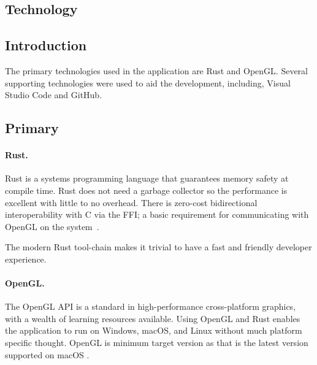 \setlength{\columnsep}{0.5cm}
\begin{multicols}{2}

  \section{Technology}\label{technology}

  \subsection{Introduction}
  The primary technologies used in the application are Rust and OpenGL\@.
  Several supporting technologies were used to aid the development, including, Visual Studio Code and GitHub.

  \subsection{Primary}

  \paragraph{ Rust.}
  Rust is a systems programming language that guarantees memory safety at compile time.
  Rust does not need a garbage collector so the performance is excellent with little to no overhead.
  There is zero-cost bidirectional interoperability with C via the FFI\@;
  a basic requirement for communicating with OpenGL on the system~\autocite{rust_programming_language_rust_2020}.

  The modern Rust tool-chain makes it trivial to have a fast and friendly developer experience.

  \paragraph{OpenGL.}
  The OpenGL API is a standard in high-performance cross-platform graphics, with a wealth of learning resources available.
  Using OpenGL and Rust enables the application to run on Windows, macOS, and Linux without much platform specific thought. OpenGL  is minimum target version as that is the latest version supported on macOS \autocite{opengl_opengl_2020}.


\end{multicols}
